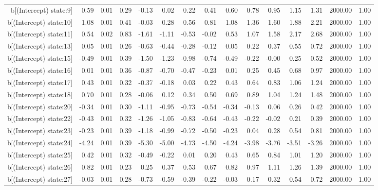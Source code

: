 \begin{table}[ht]
\begin{tabular}{rrrrrrrrrrrrrrr}
  b[(Intercept) state:9] & 0.59 & 0.01 & 0.29 & -0.13 & 0.02 & 0.22 & 0.41 & 0.60 & 0.78 & 0.95 & 1.15 & 1.31 & 2000.00 & 1.00 \\ 
  b[(Intercept) state:10] & 1.08 & 0.01 & 0.41 & -0.03 & 0.28 & 0.56 & 0.81 & 1.08 & 1.36 & 1.60 & 1.88 & 2.21 & 2000.00 & 1.00 \\ 
  b[(Intercept) state:11] & 0.54 & 0.02 & 0.83 & -1.61 & -1.11 & -0.53 & -0.02 & 0.53 & 1.07 & 1.58 & 2.17 & 2.68 & 2000.00 & 1.00 \\ 
  b[(Intercept) state:13] & 0.05 & 0.01 & 0.26 & -0.63 & -0.44 & -0.28 & -0.12 & 0.05 & 0.22 & 0.37 & 0.55 & 0.72 & 2000.00 & 1.00 \\ 
  b[(Intercept) state:15] & -0.49 & 0.01 & 0.39 & -1.50 & -1.23 & -0.98 & -0.74 & -0.49 & -0.22 & -0.00 & 0.25 & 0.52 & 2000.00 & 1.00 \\ 
  b[(Intercept) state:16] & 0.01 & 0.01 & 0.36 & -0.87 & -0.70 & -0.47 & -0.23 & 0.01 & 0.25 & 0.45 & 0.68 & 0.97 & 2000.00 & 1.00 \\ 
  b[(Intercept) state:17] & 0.43 & 0.01 & 0.32 & -0.37 & -0.18 & 0.03 & 0.22 & 0.43 & 0.64 & 0.83 & 1.06 & 1.24 & 2000.00 & 1.00 \\ 
  b[(Intercept) state:18] & 0.70 & 0.01 & 0.28 & -0.06 & 0.12 & 0.34 & 0.50 & 0.69 & 0.89 & 1.04 & 1.24 & 1.48 & 2000.00 & 1.00 \\ 
  b[(Intercept) state:20] & -0.34 & 0.01 & 0.30 & -1.11 & -0.95 & -0.73 & -0.54 & -0.34 & -0.13 & 0.06 & 0.26 & 0.42 & 2000.00 & 1.00 \\ 
  b[(Intercept) state:22] & -0.43 & 0.01 & 0.32 & -1.26 & -1.05 & -0.83 & -0.64 & -0.43 & -0.22 & -0.02 & 0.21 & 0.39 & 2000.00 & 1.00 \\ 
  b[(Intercept) state:23] & -0.23 & 0.01 & 0.39 & -1.18 & -0.99 & -0.72 & -0.50 & -0.23 & 0.04 & 0.28 & 0.54 & 0.81 & 2000.00 & 1.00 \\ 
  b[(Intercept) state:24] & -4.24 & 0.01 & 0.39 & -5.30 & -5.00 & -4.73 & -4.50 & -4.24 & -3.98 & -3.76 & -3.51 & -3.26 & 2000.00 & 1.00 \\ 
  b[(Intercept) state:25] & 0.42 & 0.01 & 0.32 & -0.49 & -0.22 & 0.01 & 0.20 & 0.43 & 0.65 & 0.84 & 1.01 & 1.20 & 2000.00 & 1.00 \\ 
  b[(Intercept) state:26] & 0.82 & 0.01 & 0.23 & 0.25 & 0.37 & 0.53 & 0.67 & 0.82 & 0.97 & 1.11 & 1.26 & 1.39 & 2000.00 & 1.00 \\ 
  b[(Intercept) state:27] & -0.03 & 0.01 & 0.28 & -0.73 & -0.59 & -0.39 & -0.22 & -0.03 & 0.17 & 0.32 & 0.54 & 0.72 & 2000.00 & 1.00 \\ 

\end{tabular}
\end{table}
